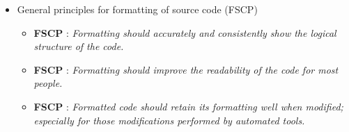 \begin{itemize}
  \begin{itemize}
  {}\item\GCGTestForException.
  {}\item\GCGAvoidRawPointers.
  {}\item\GCGTeuchosPtr.
  {}\item\GCGTeuchosRCP.
  {}\item\GCGTeuchosArrayView.
  {}\item\GCGTeuchosArray.
  {}\item\GCGTeuchosArrayRCP.
  {}\item\GCGTeuchosMap.
  {}\item\GCGTeuchosAs.
  {}\item\GCGNamespaceClassFuncDefs.
  {}\item\GCGNamespaceFuncDefs.
  {}\item\GCGFuncArgsOrder.
  {}\item\GCGNomemberObjectFuncs.
  {}\item\GCGEnumFuncArgs.
  {}\item\GCGTeuchosParamterListAcceptor.
  {}\item\GCGStdStream.
  {}\item\GCGTeuchosFancyOStream.
  {}\item\GCGTeuchosDescribable.
  {}\item\GCGTeuchosVerboseObject.
  {}\item\GCGTeuchosVerboseObjectBaseDefaultOStream.
  {}\item\GCGTemplateHeaders.
  {}\item\GCGStandardCppHeaders.
  \end{itemize}

\item General principles for formatting of source code (FSCP)

  \setcounter{Thyra_FSCP_counter}{0}

  \begin{itemize}

  {}\item{}\textbf{FSCP
  {}}: {}\textit{Formatting should accurately and
  consistently show the logical structure of the code.}

  {}\item{}\textbf{FSCP
  {}}: {}\textit{Formatting should improve the
  readability of the code for most people.}

  {}\item{}\textbf{FSCP
  {}}: {}\textit{Formatted code should retain its
  formatting well when modified; especially for those modifications performed
  by automated tools.}


\end{itemize}
\end{itemize}
